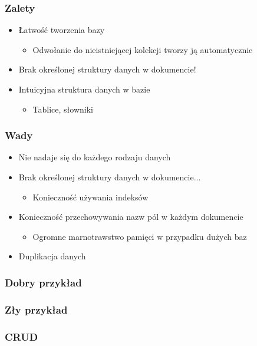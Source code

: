 \documentclass{beamer}
\begin{document}
  \begin{frame}
    \frametitle{Zalety}
    \begin{itemize}
      \item Łatwość tworzenia bazy
      \begin{itemize}
        \item Odwołanie do nieistniejącej kolekcji tworzy ją automatycznie
      \end{itemize}
      \item Brak określonej struktury danych w dokumencie!
      \item Intuicyjna struktura danych w bazie
      \begin{itemize}
        \item Tablice, słowniki
      \end{itemize}
    \end{itemize}
  \end{frame}

  \begin{frame}
    \frametitle{Wady}
    \begin{itemize}
      \item Nie nadaje się do każdego rodzaju danych
      \item Brak określonej struktury danych w dokumencie...
      \begin{itemize}
        \item Konieczność używania indeksów
      \end{itemize}
      \item Konieczność przechowywania nazw pól w każdym dokumencie
      \begin{itemize}
        \item Ogromne marnotrawstwo pamięci w przypadku dużych baz
      \end{itemize}
      \item Duplikacja danych
    \end{itemize}
  \end{frame}

  \begin{frame}
    \frametitle{Dobry przykład}
  \end{frame}

  \begin{frame}
    \frametitle{Zły przykład}
  \end{frame}

  \begin{frame}
    \frametitle{CRUD}
  \end{frame}
\end{document}
